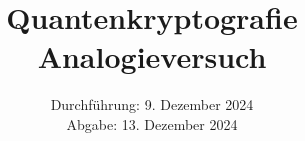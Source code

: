 

\subject{\texorpdfstring{\vspace{2ex}}{}V00\texorpdfstring{\vspace{-2ex}}{}} %
\title{Quantenkryptografie Analogieversuch} %
\date{
	Durchführung: 9. Dezember 2024 %
	\\ Abgabe: 13. Dezember 2024 %
}





\maketitle
\thispagestyle{empty}

\tableofcontents
\newpage








\newpage
\printbibliography{}


